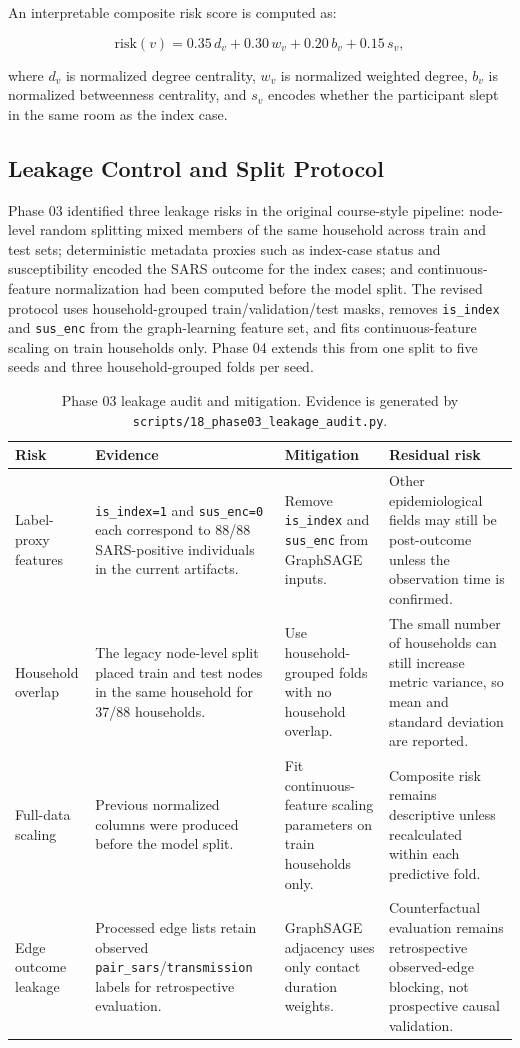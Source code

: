 \documentclass[11pt,a4paper]{article}
\begin{document}
An interpretable composite risk score is computed as:

\[
\mathrm{risk}(v) =
0.35\,d_v +
0.30\,w_v +
0.20\,b_v +
0.15\,s_v ,
\]

where \(d_v\) is normalized degree centrality, \(w_v\) is normalized weighted degree, \(b_v\) is normalized betweenness centrality, and \(s_v\) encodes whether the participant slept in the same room as the index case.

\subsection{Leakage Control and Split Protocol}

Phase 03 identified three leakage risks in the original course-style pipeline: node-level random splitting mixed members of the same household across train and test sets; deterministic metadata proxies such as index-case status and susceptibility encoded the SARS outcome for the index cases; and continuous-feature normalization had been computed before the model split. The revised protocol uses household-grouped train/validation/test masks, removes \texttt{is\_index} and \texttt{sus\_enc} from the graph-learning feature set, and fits continuous-feature scaling on train households only. Phase 04 extends this from one split to five seeds and three household-grouped folds per seed.

\begin{table}[htbp]
\centering
\caption{Phase 03 leakage audit and mitigation. Evidence is generated by \texttt{scripts/18\_phase03\_leakage\_audit.py}.}
\label{tab:leakage-audit}
\begin{tabularx}{\textwidth}{p{}X X X}
\toprule
Risk & Evidence & Mitigation & Residual risk \\
\midrule
Label-proxy features & \texttt{is\_index=1} and \texttt{sus\_enc=0} each correspond to 88/88 SARS-positive individuals in the current artifacts. & Remove \texttt{is\_index} and \texttt{sus\_enc} from GraphSAGE inputs. & Other epidemiological fields may still be post-outcome unless the observation time is confirmed. \\
Household overlap & The legacy node-level split placed train and test nodes in the same household for 37/88 households. & Use household-grouped folds with no household overlap. & The small number of households can still increase metric variance, so mean and standard deviation are reported. \\
Full-data scaling & Previous normalized columns were produced before the model split. & Fit continuous-feature scaling parameters on train households only. & Composite risk remains descriptive unless recalculated within each predictive fold. \\
Edge outcome leakage & Processed edge lists retain observed \texttt{pair\_sars}/\texttt{transmission} labels for retrospective evaluation. & GraphSAGE adjacency uses only contact duration weights. & Counterfactual evaluation remains retrospective observed-edge blocking, not prospective causal validation. \\
\bottomrule
\end{tabularx}
\end{table}
\end{document}
